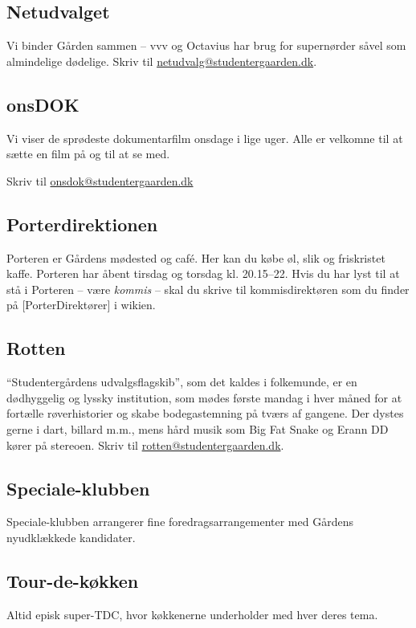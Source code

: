 \documentclass[11pt,article,twoside,openany,danish,extrafontsizes]{memoir} %
\begin{document}
\subsection{Netudvalget}
Vi binder Gården sammen -- vvv og Octavius har brug for supernørder såvel som almindelige dødelige. %
Skriv til \url{netudvalg@studentergaarden.dk}.

\subsection{onsDOK}
Vi viser de sprødeste dokumentarfilm onsdage i lige uger. Alle er velkomne til at sætte en film på og til at se med.

\noindent
Skriv til \url{onsdok@studentergaarden.dk}

\subsection{Porterdirektionen}
Porteren er Gårdens mødested og café. Her kan du købe øl, slik og friskristet kaffe. Porteren har åbent tirsdag og torsdag kl. 20.15--22. Hvis du har lyst til at stå i Porteren -- være \emph{kommis} -- skal du skrive til kommisdirektøren som du finder på [PorterDirektører] i wikien.

\subsection{Rotten}
\enquote{Studentergårdens udvalgsflagskib}, som det kaldes i folkemunde, er en dødhyggelig og lyssky institution, som mødes første mandag i hver måned for at fortælle røverhistorier og skabe bodegastemning på tværs af gangene. Der dystes gerne i dart, billard m.m., mens hård musik som Big Fat Snake og Erann DD kører på stereoen. Skriv til \url{rotten@studentergaarden.dk}.




\subsection{Speciale-klubben}
Speciale-klubben arrangerer fine foredragsarrangementer med Gårdens ny\-udklækkede kandidater.

\subsection{Tour-de-køkken}
Altid episk super-TDC, hvor køkkenerne underholder med hver deres tema. %
\end{document}
